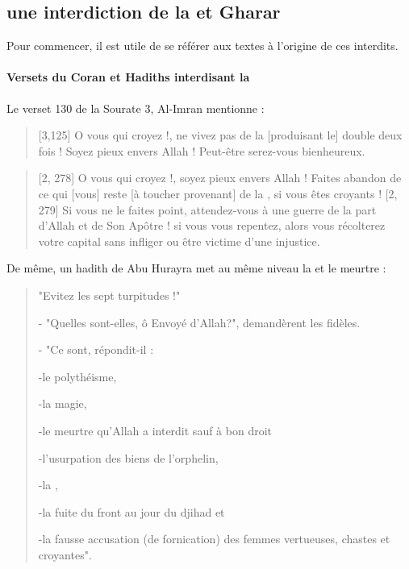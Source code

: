 \subsection{une interdiction de la \riba et Gharar}

Pour commencer, il est utile de se référer aux textes à l'origine de ces interdits.
\paragraph{Versets du Coran et Hadiths interdisant la \riba}
Le verset 130 de la Sourate 3, Al-Imran mentionne : 
\vocalize %
\transtrue %
\arabtrue %
\begin{quote}
 
   [3,125] O vous qui croyez !, ne vivez pas de la \textit{\riba} [produisant le] double deux fois ! Soyez pieux envers Allah ! Peut-être serez-vous bienheureux. 

\end{quote}
\begin{quote}
 [2, 278] O vous qui croyez !, soyez pieux envers Allah ! Faites abandon de ce qui [vous] reste [à toucher provenant] de la \textit{\riba}, si vous êtes croyants !
[2, 279] Si vous ne le faites point, attendez-vous à une guerre de la part d’Allah et de Son Apôtre ! si vous vous repentez, alors vous récolterez votre capital sans infliger ou être victime d’une injustice. 

\end{quote}

De même, un hadith de Abu Hurayra met au même niveau la \textit{\riba} et le meurtre : 
\begin{quote}
    "Evitez les sept turpitudes !"

- "Quelles sont-elles, ô Envoyé d'Allah?", demandèrent les fidèles.


- "Ce sont, répondit-il :

 

-le polythéisme,

-la magie,

-le meurtre qu'Allah a interdit sauf à bon droit

-l'usurpation des biens de l'orphelin,

-la \textit{\riba},

-la fuite du front au jour du djihad et

-la fausse accusation (de fornication) des femmes vertueuses, chastes et croyantes".
\end{quote}
 
